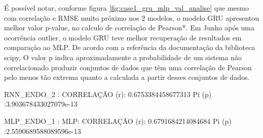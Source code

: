 \documentclass[	12pt, Times, openright, twoside, a4paper, english, brazil]{abntex2}
\begin{document}
                
                  É possível notar, conforme figura \ref{fig:case1_gru_mlp_val_analise} que mesmo com correlação e RMSE muito próximo nos 2 modelos, o modelo GRU apresentou melhor valor p-value, no calculo de correlação de Pearson*. 
                  Em Junho após uma ocorrência outlier, o modelo GRU teve melhor recuperação de resultados em comparação ao MLP.
                  De acordo com a referência da documentação da biblioteca scipy, O valor p indica aproximadamente a probabilidade de um sistema não correlacionado produzir conjuntos de dados que têm uma correlação de Pearson pelo menos tão extrema quanto a calculada a partir desses conjuntos de dados.\newline
                  
                  RNN\_ENDO\_2 :\newline 
                  CORRELAÇÃO (r): 0.6753384458677313 \newline
                  Pi (p) :3.903678433027079e-13
                  
                  
                  MLP\_ENDO\_1 :\newline 
                  MLP: CORRELAÇÃO (r): 0.6791684214084684 \newline
                  Pi (p) :2.5590689588089596e-13\newline
                  \begin{figure}[H]
                    \end{figure}

\end{document}
